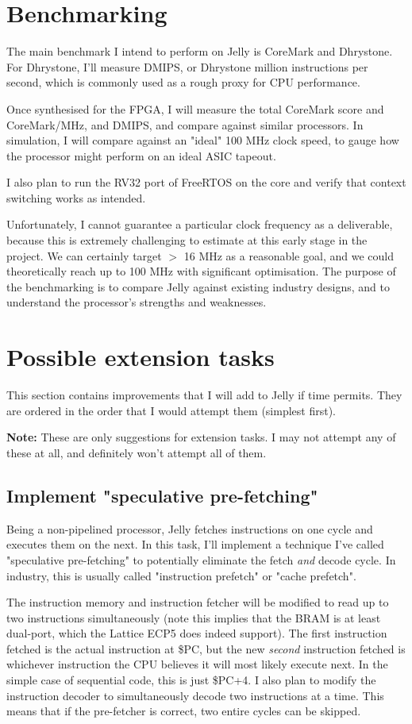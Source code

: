 \documentclass{article}
\begin{document}
\section{Benchmarking}
The main benchmark I intend to perform on Jelly is CoreMark and Dhrystone. For Dhrystone, I'll measure DMIPS,
or Dhrystone million instructions per second, which is commonly used as a rough proxy for CPU performance.

Once synthesised for the FPGA, I will measure the total CoreMark score and CoreMark/MHz, and DMIPS, and
compare against similar processors. In simulation, I will compare against an "ideal" 100 MHz clock speed, to
gauge how the processor might perform on an ideal ASIC tapeout.

I also plan to run the RV32 port of FreeRTOS on the core and verify that context switching works as intended.

Unfortunately, I cannot guarantee a particular clock frequency as a deliverable, because this is extremely
challenging to estimate at this early stage in the project. We can certainly target $>$ 16 MHz as a
reasonable goal, and we could theoretically reach up to 100 MHz with significant optimisation. The purpose of
the benchmarking is to compare Jelly against existing industry designs, and to understand the processor's
strengths and weaknesses.

\section{Possible extension tasks}
This section contains improvements that I will add to Jelly if time permits. They are ordered in the order
that I would attempt them (simplest first).

\textbf{Note:} These are only suggestions for extension tasks. I may not attempt any of these at all, and 
definitely won't attempt all of them.

\subsection{Implement "speculative pre-fetching"}
Being a non-pipelined processor, Jelly fetches instructions on one cycle and executes them on the next. In
this task, I'll implement a technique I've called "speculative pre-fetching" to potentially eliminate the
fetch \textit{and} decode cycle. In industry, this is usually called "instruction prefetch" or "cache
prefetch".

The instruction memory and instruction fetcher will be modified to read up to two instructions simultaneously
(note this implies that the BRAM is at least dual-port, which the Lattice ECP5 does indeed support). The
first instruction fetched is the actual instruction at \$PC, but the new \textit{second} instruction fetched
is whichever instruction the CPU believes it will most likely execute next. In the simple case of sequential
code, this is just \$PC+4. I also plan to modify the instruction decoder to simultaneously decode two
instructions at a time. This means that if the pre-fetcher is correct, two entire cycles can be skipped.
\end{document}
